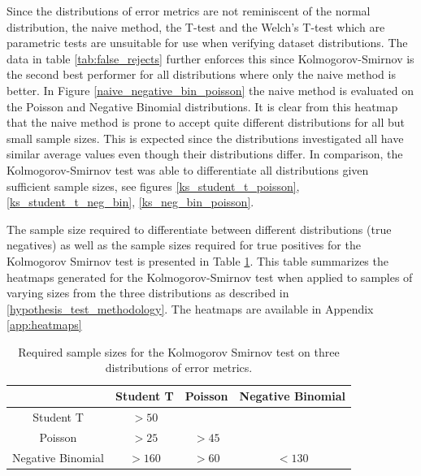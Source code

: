 Since the distributions of error metrics are not reminiscent of the normal distribution, the naive method, the T-test and the Welch's T-test which are parametric tests are unsuitable for use when verifying dataset distributions. The data in table \ref{tab:false_rejects} further enforces this since Kolmogorov-Smirnov is the second best performer for all distributions where only the naive method is better. In Figure \ref{naive_negative_bin_poisson} the naive method is evaluated on the Poisson and Negative Binomial distributions. It is clear from this heatmap that the naive method is prone to accept quite different distributions for all but small sample sizes. This is expected since the distributions investigated all have similar average values even though their distributions differ. In comparison, the Kolmogorov-Smirnov test was able to differentiate all distributions given sufficient sample sizes, see figures \ref{ks_student_t_poisson}, \ref{ks_student_t_neg_bin}, \ref{ks_neg_bin_poisson}.

The sample size required to differentiate between different distributions (true negatives) as well as the sample sizes required for true positives for the Kolmogorov Smirnov test is presented in Table \ref{tab:required_sample_sizes}. This table summarizes the heatmaps generated for the Kolmogorov-Smirnov test when applied to samples of varying sizes from the three distributions as described in \ref{hypothesis_test_methodology}. The heatmaps are available in Appendix \ref{app:heatmaps}

\begin{table}[htp]
  \centering
  \begin{tabular}{cccc}
                      & Student T & Poisson & Negative Binomial \\
    \hline
    Student T         & \(>50\)   &         &                   \\
    \hline
    Poisson           & \(>25\)   & \(>45\) &                   \\
    \hline
    Negative Binomial & \(>160\)  & \(>60\) & \(<130\)          \\
  \end{tabular}
  \caption{Required sample sizes for the Kolmogorov Smirnov test on three distributions of error metrics.}
  \label{tab:required_sample_sizes}
\end{table}

